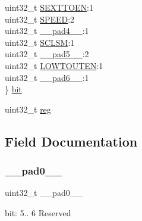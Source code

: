 \begin{DoxyCompactItemize}
\begin{tabbing}
\>uint32\_t \mbox{\hyperlink{union_s_e_r_c_o_m___i2_c_s___c_t_r_l_a___type_a7bb2c0fdd43b2e6cd251b9bc8171caff}{SEXTTOEN}}:1\\
\>uint32\_t \mbox{\hyperlink{union_s_e_r_c_o_m___i2_c_s___c_t_r_l_a___type_ac9b7e20ad3da84dff4e0cdd8bf58e4a3}{SPEED}}:2\\
\>uint32\_t \mbox{\hyperlink{union_s_e_r_c_o_m___i2_c_s___c_t_r_l_a___type_a7b2edc85d90e34c4435951e1e5c59517}{\_\_pad4\_\_}}:1\\
\>uint32\_t \mbox{\hyperlink{union_s_e_r_c_o_m___i2_c_s___c_t_r_l_a___type_a3ac441d6088ab8d472aafd3081690747}{SCLSM}}:1\\
\>uint32\_t \mbox{\hyperlink{union_s_e_r_c_o_m___i2_c_s___c_t_r_l_a___type_ab025634e229ec6df5ae63fd78be1f27b}{\_\_pad5\_\_}}:2\\
\>uint32\_t \mbox{\hyperlink{union_s_e_r_c_o_m___i2_c_s___c_t_r_l_a___type_a11f66956297c8e71dfd6897ef7e9b5de}{LOWTOUTEN}}:1\\
\>uint32\_t \mbox{\hyperlink{union_s_e_r_c_o_m___i2_c_s___c_t_r_l_a___type_a9bf3ba9849347338e4a72e6c4e3758f7}{\_\_pad6\_\_}}:1\\
\} \mbox{\hyperlink{union_s_e_r_c_o_m___i2_c_s___c_t_r_l_a___type_ae74a0f94af28f0568fede750ad46a517}{bit}}\\

\end{tabbing}\item 
uint32\+\_\+t \mbox{\hyperlink{union_s_e_r_c_o_m___i2_c_s___c_t_r_l_a___type_a6b91636401516a477989a336376d7b40}{reg}}
\end{DoxyCompactItemize}


\subsection{Field Documentation}
\mbox{\label{union_s_e_r_c_o_m___i2_c_s___c_t_r_l_a___type_a3e57c2ef1c3ffb36722f000cc1156824}} 
\subsubsection{\texorpdfstring{\_\_pad0\_\_}{\_\_pad0\_\_}}
{\footnotesize\ttfamily uint32\+\_\+t \+\_\+\+\_\+pad0\+\_\+\+\_\+}

bit\+: 5.. 6 Reserved \mbox{\label{union_s_e_r_c_o_m___i2_c_s___c_t_r_l_a___type_a6712ba6dd1d5b43d2d56ff8ac4e275a7}} 
